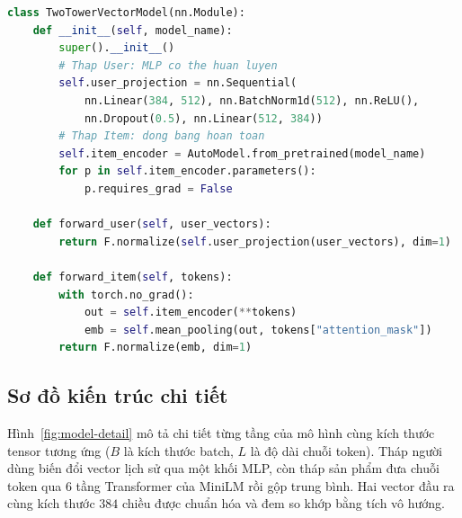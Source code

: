 \begin{lstlisting}[language=Python, caption=Mô hình hai tháp (tháp sản phẩm đóng băng)]
class TwoTowerVectorModel(nn.Module):
    def __init__(self, model_name):
        super().__init__()
        # Thap User: MLP co the huan luyen
        self.user_projection = nn.Sequential(
            nn.Linear(384, 512), nn.BatchNorm1d(512), nn.ReLU(),
            nn.Dropout(0.5), nn.Linear(512, 384))
        # Thap Item: dong bang hoan toan
        self.item_encoder = AutoModel.from_pretrained(model_name)
        for p in self.item_encoder.parameters():
            p.requires_grad = False

    def forward_user(self, user_vectors):
        return F.normalize(self.user_projection(user_vectors), dim=1)

    def forward_item(self, tokens):
        with torch.no_grad():
            out = self.item_encoder(**tokens)
            emb = self.mean_pooling(out, tokens["attention_mask"])
        return F.normalize(emb, dim=1)
\end{lstlisting}

\subsection{Sơ đồ kiến trúc chi tiết}

Hình~\ref{fig:model-detail} mô tả chi tiết từng tầng của mô hình cùng kích thước
tensor tương ứng ($B$ là kích thước batch, $L$ là độ dài chuỗi token). Tháp người
dùng biến đổi vector lịch sử qua một khối MLP, còn tháp sản phẩm đưa chuỗi token qua
$6$ tầng Transformer của MiniLM rồi gộp trung bình. Hai vector đầu ra cùng kích
thước $384$ chiều được chuẩn hóa và đem so khớp bằng tích vô hướng.

